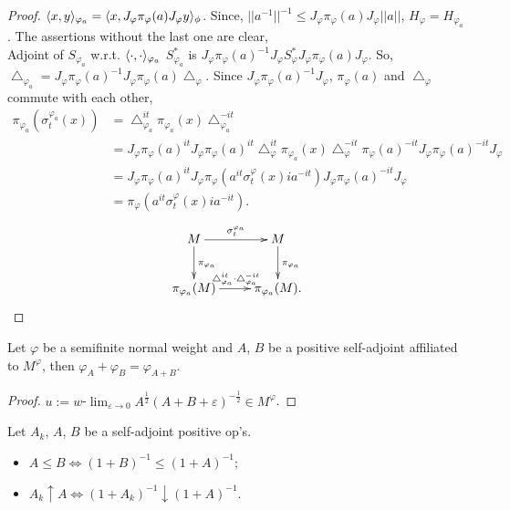 \begin{proof}
  $\langle x,y\rangle_{\varphi_a} = \langle x, J_\varphi \pi_\varphi(a) J_\varphi y \rangle_\phi$. 
  Since, $||a^{-1}||^{-1} \leq J_\varphi \pi_\varphi(a) J_\varphi ||a||$, $H_\varphi = H_{\varphi_a}$.
  The assertions without the last one are clear, \\
  Adjoint of $S_{\varphi_a}$ w.r.t. $\langle\cdot,\cdot\rangle_{\varphi_a}$ $S_{\varphi_a}^*$ is $J_\varphi \pi_\varphi(a)^{-1} J_\varphi S_\varphi^* J_\varphi \pi_\varphi(a) J_\varphi$.
  So, $\bigtriangleup_{\varphi_a} = J_\varphi \pi_\varphi(a)^{-1} J_\varphi\pi_\varphi(a) \bigtriangleup_\varphi$.
  Since $J_\varphi \pi_\varphi(a)^{-1} J_\varphi $, $\pi_\varphi(a)$ and $ \bigtriangleup_\varphi$ commute with each other,
  \begin{align*}
    \pi_{\varphi_a}(\sigma_t^{\varphi_a}(x)) &= \bigtriangleup_{\varphi_a}^{it} \pi_{\varphi_a}(x) \bigtriangleup_{\varphi_a}^{-it}\\
    &= J_\varphi \pi_\varphi(a)^{it} J_\varphi\pi_\varphi(a)^{it} \bigtriangleup_\varphi^{it} \pi_{\varphi_a}(x) \bigtriangleup_\varphi^{-it} \pi_\varphi(a)^{-it}  J_\varphi \pi_\varphi(a)^{-it} J_\varphi\\
    &= J_\varphi \pi_\varphi(a)^{it} J_\varphi\pi_\varphi(a^{it}\sigma_t^\varphi(x)i a^{-it}) J_\varphi \pi_\varphi(a)^{-it} J_\varphi\\
    &= \pi_\varphi(a^{it}\sigma_t^\varphi(x)i a^{-it}).
  \end{align*}
 \[
  \xymatrix{
    M \ar[r]^{\sigma_t^{\varphi_a}} \ar[d]^{\pi_{\varphi_a}} & M \ar[d]^{\pi_{\varphi_a}} \\
    \pi_{\varphi_a}(M) \ar[r]^{\bigtriangleup_{\varphi_a}^{it} \cdot \bigtriangleup_{\varphi_a}^{-it}}& \pi_{\varphi_a}(M) .
  }
  \]
\end{proof}

\begin{proposition}
  Let $\varphi$ be a semifinite normal weight and $A$, $B$ be a positive self-adjoint affiliated to $M^\varphi$, then $\varphi_A + \varphi_B = \varphi_{A+B}$.
\end{proposition}

\begin{proof}
  $u := w$-$\lim_{\varepsilon \rightarrow 0}A^{\frac{1}{2}}(A+B+\varepsilon)^{-\frac{1}{2}} \in M^\varphi$.
\end{proof}

\begin{definition}
  Let $A_k$, $A$, $B$ be a self-adjoint positive op's. 
  \begin{itemize}
    \item $A \leq B \Leftrightarrow (1+B)^{-1} \leq (1+A)^{-1}$;
    \item $A_k \uparrow A \Leftrightarrow (1+A_k)^{-1} \downarrow (1+A)^{-1}$.
  \end{itemize}
\end{definition}

